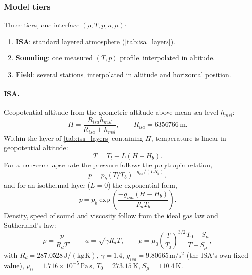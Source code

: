 \subsubsection{Model tiers}\label{sec:atmos_tiers}
Three tiers, one interface $(\rho, T, p, a, \mu)$:
\begin{enumerate}
    \item \textbf{ISA}: standard layered atmosphere (\autoref{tab:isa_layers}).
    \item \textbf{Sounding}: one measured $(T, p)$ profile, interpolated in altitude.
    \item \textbf{Field}: several stations, interpolated in altitude and horizontal position.
\end{enumerate}

\paragraph{ISA.} Geopotential altitude from the geometric altitude above mean sea level $h_{msl}$:
\begin{equation}
    H = \frac{R_{isa}h_{msl}}{R_{isa}+h_{msl}}, \qquad R_{isa} = 6356766\,\mathrm{m}.
\end{equation}
Within the layer of \autoref{tab:isa_layers} containing $H$, temperature is linear in geopotential altitude:
\begin{equation}
    T = T_b + L(H-H_b).
\end{equation}
For a non-zero lapse rate the pressure follows the polytropic relation,
\begin{equation}
    p = p_b(T/T_b)^{-g_{isa}/(LR_d)},
\end{equation}
and for an isothermal layer ($L=0$) the exponential form,
\begin{equation}
    p = p_b\exp\!\left(\frac{-g_{isa}(H-H_b)}{R_dT_b}\right).
\end{equation}
Density, speed of sound and viscosity follow from the ideal gas law and Sutherland's law:
\begin{equation}
    \rho = \frac{p}{R_dT}, \qquad a = \sqrt{\gamma R_dT}, \qquad
    \mu = \mu_0\left(\frac{T}{T_0}\right)^{3/2}\frac{T_0+S_\mu}{T+S_\mu},
\end{equation}
with $R_d = 287.0528\,\mathrm{J/(kg\,K)}$, $\gamma = 1.4$, $g_{isa} = 9.80665\,\mathrm{m/s^2}$ (the
ISA's own fixed value), $\mu_0 = 1.716\times10^{-5}\,\mathrm{Pa\,s}$,
$T_0 = 273.15\,\mathrm{K}$, $S_\mu = 110.4\,\mathrm{K}$.


